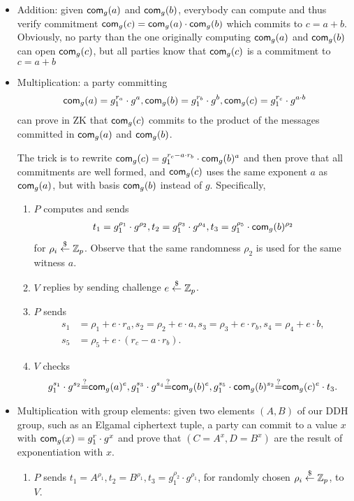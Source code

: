\documentclass{article}
\begin{document}
\begin{itemize}
\item Addition: given $\mathsf{com}_g(a)$ and $\mathsf{com}_g(b)$, everybody can
  compute and thus verify commitment
  $\mathsf{com}_g(c)=\mathsf{com}_g(a)\cdot{}\mathsf{com}_g(b)$ which commits to
  $c=a+b$. Obviously, no party than the one originally computing
  $\mathsf{com}_g(a)$ and $\mathsf{com}_g(b)$ can open $\mathsf{com}_g(c)$, but all parties
  know that $\mathsf{com}_g(c)$ is a commitment to $c=a+b$
  
\item Multiplication: a party committing
  \begin{align*}
  \mathsf{com}_g(a)=g_1^{r_a}\cdot{}g^a, \mathsf{com}_g(b)=g_1^{r_b}\cdot{}g^b,
  \mathsf{com}_g(c)=g_1^{r_c}\cdot{}g^{a\cdot{}b}
  \end{align*}
  can prove in ZK that
  $\mathsf{com}_g(c)$ commits to the product of the messages committed in
  $\mathsf{com}_g(a)$ and $\mathsf{com}_g(b)$.

  The trick is to rewrite
  $\mathsf{com}_g(c)=g_1^{r_c-a\cdot{}r_b}\cdot\mathsf{com}_g(b)^{a}$ and then prove
  that all commitments are well formed, and $\mathsf{com}_g(c)$ uses the same
  exponent $a$ as $\mathsf{com}_g(a)$, but with basis $\mathsf{com}_g(b)$ instead of
  $g$. Specifically,
  \begin{enumerate}
  \item $P$ computes and sends
    \begin{align*}
      t_1=g_1^{\rho_1}\cdot{}g^{\rho_2},
      t_2=g_1^{\rho_3}\cdot{}g^{\rho_4},
      t_3=g_1^{\rho_5}\cdot{}\mathsf{com}_g(b)^{\rho_2}
      \end{align*}
      for $\rho_i\stackrel{\$}{\leftarrow}\mathbb{Z}_p$. Observe that the same randomness $\rho_2$
      is used for the same witness $a$.
    \item $V$ replies by sending challenge $e\stackrel{\$}{\leftarrow}\mathbb{Z}_p$.
    \item $P$ sends
      \begin{align*}
        s_1&=\rho_1+e\cdot{}r_a,s_2=\rho_2+e\cdot{}a,s_3=\rho_3+e\cdot{}r_b,s_4=\rho_4+e\cdot{}b,\\s_5&=\rho_5+e\cdot{}(r_c-a\cdot{}r_b).
        \end{align*}
    \item $V$ checks
      \begin{align*}
        g_1^{s_1}\cdot{}g^{s_2}{\stackrel{?}{=}}{}\mathsf{com}_g(a)^e, g_1^{s_3}\cdot{}g^{s_4}{\stackrel{?}{=}}{}\mathsf{com}_g(b)^e, g_1^{s_5}\cdot{}\mathsf{com}_g(b)^{s_2}{\stackrel{?}{=}}{}\mathsf{com}_g(c)^e\cdot{}t_3.
        \end{align*}
\end{enumerate}

  \item Multiplication with group elements: given two elements $(A,B)$
    of our DDH group, such as an Elgamal ciphertext tuple, a party can
    commit to a value $x$ with $\mathsf{com}_g(x) =g_1^r\cdot{}g^x$ and prove
    that $(C=A^x,D=B^x)$ are the result of exponentiation with $x$.
    \begin{enumerate}
      \item $P$ sends $t_1=A^{\rho_1},t_2=B^{\rho_1},
        t_3=g_1^{\rho_2}\cdot{}g^{\rho_1}$, for randomly chosen
        $\rho_i\stackrel{\$}{\leftarrow}\mathbb{Z}_p$, to $V$.


\end{enumerate}
\end{itemize}
\end{document}
